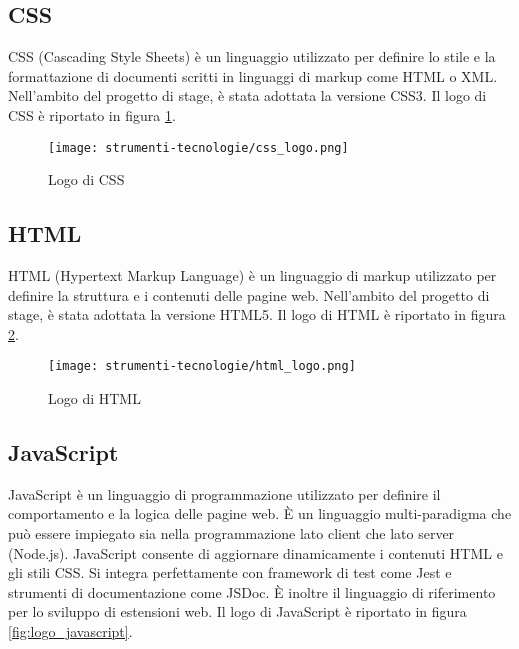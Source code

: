 \subsection*{CSS}

\par CSS (Cascading Style Sheets) è un linguaggio utilizzato per definire lo stile e la formattazione di documenti scritti in linguaggi di markup come HTML o XML. Nell’ambito del progetto di stage, è stata adottata la versione CSS3. Il logo di CSS è riportato in figura \ref{fig:logo_css}.

\begin{figure}[H]
  \centering 
  \texttt{[image: strumenti-tecnologie/css\_logo.png]} 
  \caption{Logo di CSS}
  \label{fig:logo_css} 
\end{figure}

\subsection*{HTML}

\par HTML (Hypertext Markup Language) è un linguaggio di markup utilizzato per definire la struttura e i contenuti delle pagine web. Nell’ambito del progetto di stage, è stata adottata la versione HTML5. Il logo di HTML è riportato in figura \ref{fig:logo_html}.

\begin{figure}[H]
  \centering 
  \texttt{[image: strumenti-tecnologie/html\_logo.png]} 
  \caption{Logo di HTML}
  \label{fig:logo_html} 
\end{figure}

\subsection*{JavaScript}

\par JavaScript è un linguaggio di programmazione utilizzato per definire il comportamento e la logica delle pagine web. È un linguaggio multi-paradigma che può essere impiegato sia nella programmazione lato client che lato server (Node.js). JavaScript consente di aggiornare dinamicamente i contenuti HTML e gli stili CSS. Si integra perfettamente con \gls{framework} di test come Jest e strumenti di documentazione come JSDoc. È inoltre il linguaggio di riferimento per lo sviluppo di estensioni web. Il logo di JavaScript è riportato in figura \ref{fig:logo_javascript}.

